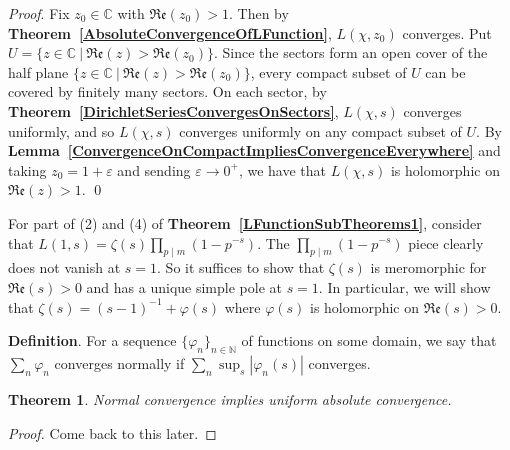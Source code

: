 \documentclass[12pt]{article}
\newcommand{\nats}{\mathbb{N}}
\newcommand{\complex}{\mathbb{C}}
\newcommand{\lref}[1]{\textbf{Lemma~\ref{#1}}}
\newcommand{\tref}[1]{\textbf{Theorem~\ref{#1}}}
\newtheorem{thm}{Theorem}
\numberwithin{equation}{section}
\numberwithin{thm}{section}
\numberwithin{lemma}{section}
\numberwithin{cor}{section}
\begin{document}
\textit{Proof}. Fix $z_0 \in \complex$ with $\mathfrak{Re}(z_0) > 1$. Then by \tref{AbsoluteConvergenceOfLFunction}, $L(\chi, z_0)$ converges. Put $U = \{ z \in \complex \ | \ \mathfrak{Re}(z) > \mathfrak{Re}(z_0) \}$. Since the sectors form an open cover of the half plane $\{ z \in \complex \ | \ \mathfrak{Re}(z) > \mathfrak{Re}(z_0) \}$, every compact subset of $U$ can be covered by finitely many sectors. On each sector, by \tref{DirichletSeriesConvergesOnSectors}, $L(\chi, s)$ converges uniformly, and so $L(\chi, s)$ converges uniformly on any compact subset of $U$. By \lref{ConvergenceOnCompactImpliesConvergenceEverywhere} and taking $z_0 = 1 + \varepsilon$ and sending $\varepsilon \to 0^+$, we have that $L(\chi, s)$ is holomorphic on $\mathfrak{Re}(z) > 1$. \qed

For part of (2) and (4) of \tref{LFunctionSubTheorems1}, consider that $L(1, s) = \zeta(s) \prod_{p \mid m} (1 - p^{-s})$. The $\prod_{p \mid m}(1 - p^{-s})$ piece clearly does not vanish at $s = 1$. So it suffices to show that $\zeta(s)$ is meromorphic for $\mathfrak{Re}(s) > 0$ and has a unique simple pole at $s = 1$. In particular, we will show that $\zeta(s) = (s-1)^{-1} + \varphi(s)$ where $\varphi(s)$ is holomorphic on $\mathfrak{Re}(s) > 0$.

\textbf{Definition}. For a sequence $\{ \varphi_n \}_{n \in \nats}$ of functions on some domain, we say that $\sum_n \varphi_n$ converges normally if $\sum_n \sup_s |\varphi_n(s)|$ converges.

\begin{thm}
  Normal convergence implies uniform absolute convergence.
\end{thm}
\begin{proof}
  Come back to this later.
\end{proof}
\end{document}
